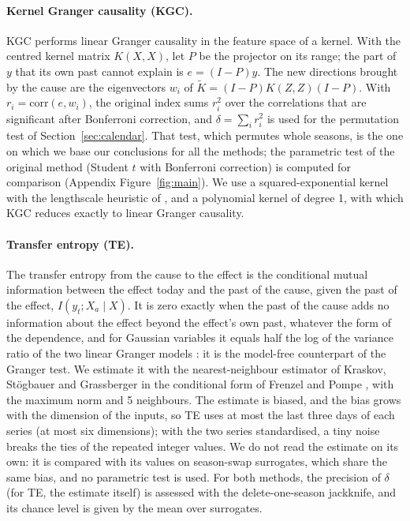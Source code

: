 \documentclass[11pt,a4paper]{article}
\begin{document}
\paragraph{Kernel Granger causality (KGC).} KGC \cite{marinazzo2008} performs linear Granger causality in the feature space of a kernel. With the centred kernel matrix $K(X,X)$, let $P$ be the projector on its range; the part of $y$ that its own past cannot explain is $e=(I-P)y$. The new directions brought by the cause are the eigenvectors $w_i$ of $\tilde K=(I-P)K(Z,Z)(I-P)$. With $r_i=\mathrm{corr}(e,w_i)$, the original index sums $r_i^2$ over the correlations that are significant after Bonferroni correction, and $\delta=\sum_i r_i^2$ is used for the permutation test of Section~\ref{sec:calendar}. That test, which permutes whole seasons, is the one on which we base our conclusions for all the methods; the parametric test of the original method (Student $t$ with Bonferroni correction) is computed for comparison (Appendix Figure~\ref{fig:main}). We use a squared-exponential kernel with the lengthscale heuristic of \cite{murphy2026}, and a polynomial kernel of degree 1, with which KGC reduces exactly to linear Granger causality.

\paragraph{Transfer entropy (TE).} The transfer entropy \cite{schreiber2000} from the cause to the effect is the conditional mutual information between the effect today and the past of the cause, given the past of the effect, $I(y_t;X_a\mid X)$. It is zero exactly when the past of the cause adds no information about the effect beyond the effect's own past, whatever the form of the dependence, and for Gaussian variables it equals half the log of the variance ratio of the two linear Granger models \cite{barnett2009}: it is the model-free counterpart of the Granger test. We estimate it with the nearest-neighbour estimator of Kraskov, St\"ogbauer and Grassberger in the conditional form of Frenzel and Pompe \cite{kraskov2004,frenzel2007}, with the maximum norm and 5 neighbours. The estimate is biased, and the bias grows with the dimension of the inputs, so TE uses at most the last three days of each series (at most six dimensions); with the two series standardised, a tiny noise breaks the ties of the repeated integer values. We do not read the estimate on its own: it is compared with its values on season-swap surrogates, which share the same bias, and no parametric test is used. For both methods, the precision of $\delta$ (for TE, the estimate itself) is assessed with the delete-one-season jackknife, and its chance level is given by the mean over surrogates.
\end{document}

